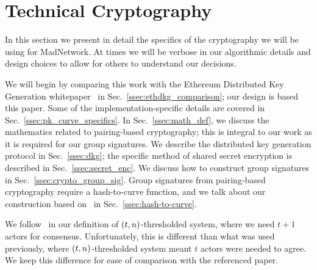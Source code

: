 \section{Technical Cryptography}
\label{sec:tech_crypto}

In this section we present in detail the specifics of the
cryptography we will be using for MadNetwork.
At times we will be verbose in our algorithmic details
and design choices to allow for others to understand our decisions.

We will begin by comparing this work with the
Ethereum Distributed Key Generation whitepaper~\cite{ethdkg}
in Sec.~\ref{ssec:ethdkg_comparison};
our design is based this paper.
Some of the implementation-specific details are covered in
Sec.~\ref{ssec:pk_curve_specifics}.
In Sec.~\ref{ssec:math_def}, we discuss the mathematics
related to pairing-based cryptography; this is integral to
our work as it is required for our group signatures.
We describe the distributed key generation protocol in
Sec.~\ref{ssec:dkg};
the specific method of shared secret encryption is
described in Sec.~\ref{ssec:secret_enc}.
We discuss how to construct group signatures in
Sec.~\ref{ssec:crypto_group_sig}.
Group signatures from pairing-based cryptography require
a hash-to-curve function, and we talk about our construction
based on~\cite{ft2012bnhashtocurve,boneh2019h2cBLS12}
in Sec.~\ref{ssec:hash-to-curve}.

We follow~\cite{ethdkg} in our definition of
$\left( t,n \right)$-thresholded system, where we need $t+1$ actors
for consensus.
Unfortunately, this is different than what was used previously,
where $\left( t,n \right)$-thresholded system meant $t$ actors were
needed to agree.
We keep this difference for ease of comparison with the referenced paper.








